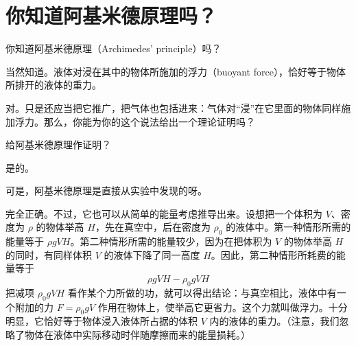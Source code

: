 
\chapter[你知道阿基米德原理吗？]{你知道阿基米德原理吗？\label{ch-16}}

\begin{dialogue}

\tchr 你知道阿基米德原理（Archimedes' principle）吗？

\stda 当然知道。液体对浸在其中的物体所施加的浮力（buoyant force），恰好等于物体所排开的液体的重力。

\tchr 对。只是还应当把它推广，把气体也包括进来：气体对“浸”在它里面的物体同样施加浮力。那么，你能为你的这个说法给出一个理论证明吗？

\stda 给阿基米德原理作证明？

\tchr 是的。

\stda 可是，阿基米德原理是直接从实验中发现的呀。

\tchr 完全正确。不过，它也可以从简单的能量考虑推导出来。设想把一个体积为 $V$、密度为 $\rho$ 的物体举高 $H$，先在真空中，后在密度为 $\rho_{0}$ 的液体中。第一种情形所需的能量等于 $\rho g V H$。第二种情形所需的能量较少，因为在把体积为 $V$ 的物体举高 $H$ 的同时，有同样体积 $V$ 的液体下降了同一高度 $H$。因此，第二种情形所耗费的能量等于
\begin{equation*}%
\rho g V H - \rho_{0} g V H
\end{equation*}
把减项 $\rho_{0} g V H$ 看作某个力所做的功，就可以得出结论：与真空相比，液体中有一个附加的力 $F=\rho_{0} g V$ 作用在物体上，使举高它更省力。这个力就叫做浮力。十分明显，它恰好等于物体浸入液体所占据的体积 $V$ 内的液体的重力。（注意，我们忽略了物体在液体中实际移动时伴随摩擦而来的能量损耗。）


\end{dialogue}
